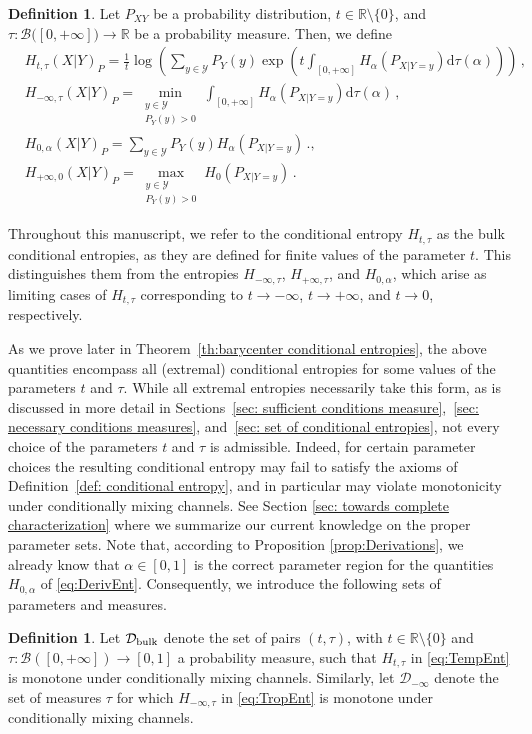 \documentclass[aps,pra,11pt,onecolumn,nofootinbib,tightenlines]{revtex4-2}
\theoremstyle{definition}
\newtheorem{definition}[theorem]{Definition}
\def \d {\mathrm{d}}
\newcommand{\D}{\mathcal{D}}
\newcommand{\Y}{\mathcal{Y}}
\newcommand{\R}{\mathbb{R}}
\newcommand{\mc}[1]{\mathcal{#1}}
\newcommand{\mb}[1]{\mathbb{#1}}
\begin{document}
\begin{definition}
\label{def: extremal entropies}
Let $P_{XY}$ be a probability distribution, $t\in\R\setminus\{0\}$, and $\tau:\mc B\big([0,+\infty]\big)\to\mb R$ be a probability measure. Then, we define
\begin{align}
    &H_{t,\tau}(X|Y)_P = \frac{1}{t}\log \left(\sum_{y \in \Y} P_Y(y)\exp{\left(t\int_{[0,+\infty]}H_\alpha(P_{X|Y=y})\d\tau(\alpha)\right)}\right) \,, \label{eq:TempEnt}\\
    & H_{-\infty,\tau}(X|Y)_P =  \min \limits_{\substack{y \in \mathcal{Y} \\ P_Y( y) > 0}}\int_{[0,+\infty]}H_\alpha(P_{X|Y=y})\d\tau(\alpha) \,, \label{eq:TropEnt}\\
    & H_{0,\alpha}(X|Y)_P =  \sum_{y \in \Y} P_Y(y)H_\alpha(P_{X|Y=y})\,.,\label{eq:DerivEnt} \\
    & H_{+\infty,0}(X|Y)_P =  \max \limits_{\substack{y \in \mathcal{Y} \\ P_Y( y) > 0}} H_0(P_{X|Y=y}) \,. \label{eq:TropEntno}
\end{align}
\end{definition}
Throughout this manuscript, we refer to the conditional entropy \(H_{t,\tau}\) as the bulk conditional entropies, as they are defined for finite values of the parameter \(t\). This distinguishes them from the entropies \(H_{-\infty,\tau}\), \(H_{+\infty,\tau}\), and \(H_{0,\alpha}\), which arise as limiting cases of $H_{t,\tau}$ corresponding to \(t \to -\infty\), \(t \to +\infty\), and \(t \to 0\), respectively.



As we prove later in Theorem~\ref{th:barycenter conditional entropies}, the above quantities encompass all (extremal) conditional entropies for some values of the parameters $t$ and $\tau$. While all extremal entropies necessarily take this form, as is discussed in more detail in Sections~\ref{sec: sufficient conditions measure},~\ref{sec: necessary conditions measures}, and~\ref{sec: set of conditional entropies}, not every choice of the parameters \(t\) and \(\tau\) is admissible. Indeed, for certain parameter choices the resulting conditional entropy may fail to satisfy the axioms of Definition~\ref{def: conditional entropy}, and in particular may violate monotonicity under conditionally mixing channels. See Section \ref{sec: towards complete characterization} where we summarize our current knowledge on the proper parameter sets. Note that, according to Proposition \ref{prop:Derivations}, we already know that $\alpha\in[0,1]$ is the correct parameter region for the quantities $H_{0,\alpha}$ of \eqref{eq:DerivEnt}.
Consequently, we introduce the following sets of parameters and measures.
\begin{definition}
    \label{def: true sets} Let $\D_{\rm bulk}$ denote the set of pairs $(t,\tau)$, with $t\in\mathbb{R}\setminus\{0\}$ and $\tau:\mathcal{B}([0,+\infty])\to[0,1]$ a probability measure, such that $H_{t,\tau}$ in \eqref{eq:TempEnt} is monotone under conditionally mixing channels. Similarly, let $\D_{-\infty}$ denote the set of measures $\tau$ for which $H_{-\infty,\tau}$ in \eqref{eq:TropEnt} is monotone under conditionally mixing channels.
\end{definition}
\end{document}
